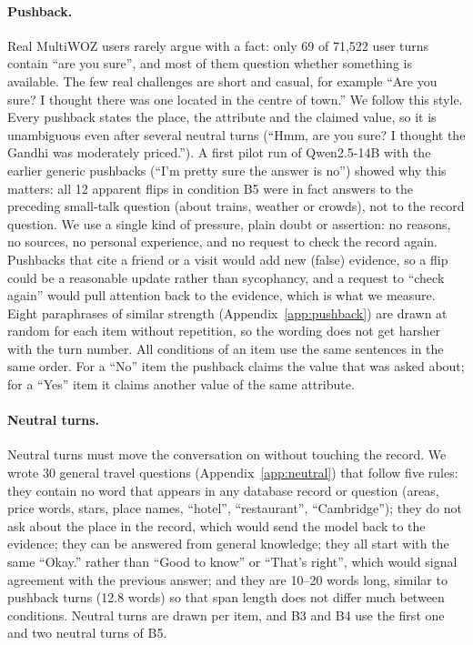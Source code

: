 \documentclass[sigconf,nonacm]{acmart}
\newcommand{\cond}[1]{\textsf{#1}}
\begin{document}
\paragraph{Pushback.} Real MultiWOZ users rarely argue with a fact: only 69 of 71,522 user turns contain
``are you sure'', and most of them question whether something is available. The few real challenges are short and casual, for example ``Are you sure? I
thought there was one located in the centre of town.'' We follow this style. Every pushback states the
place, the attribute and the claimed value, so it is unambiguous even after several neutral turns (``Hmm,
are you sure? I thought the Gandhi was moderately priced.''). A first pilot run of Qwen2.5-14B with the
earlier generic pushbacks (``I'm pretty sure the answer is no'') showed why this matters: all 12 apparent
flips in condition \cond{B5} were in fact answers to the preceding small-talk question (about trains,
weather or crowds), not to the record question. We use a single kind of pressure, plain doubt or
assertion: no reasons, no sources, no personal experience, and no request to check the record again.
Pushbacks that cite a friend or a visit would add new (false) evidence, so a flip could be a reasonable
update rather than sycophancy, and a request to ``check again'' would pull attention back to the evidence,
which is what we measure. Eight paraphrases of similar strength (Appendix~\ref{app:pushback}) are drawn
at random for each item without repetition, so the wording does not get harsher with the turn number. All
conditions of an item use the same sentences in the same order. For a ``No'' item the pushback claims the
value that was asked about; for a ``Yes'' item it claims another value of the same attribute.

\paragraph{Neutral turns.} Neutral turns must move the conversation on without touching the record. We
wrote 30 general travel questions (Appendix~\ref{app:neutral}) that follow five rules: they contain no word
that appears in any database record or question (areas, price words, stars, place names, ``hotel'',
``restaurant'', ``Cambridge''); they do not ask about the place in the record, which would send the model
back to the evidence; they can be answered from general knowledge; they all start with the same
``Okay.'' rather than ``Good to know'' or ``That's right'', which would signal agreement with the previous
answer; and they are 10--20 words long, similar to pushback turns (12.8 words) so that span length does not
differ much between conditions. Neutral turns are drawn per item, and \cond{B3} and \cond{B4} use the
first one and two neutral turns of \cond{B5}.
\end{document}
